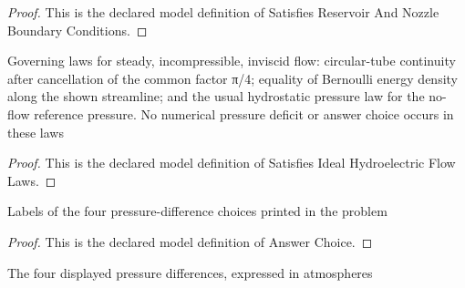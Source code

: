 \begin{proof}
  This is the declared model definition of Satisfies Reservoir And Nozzle Boundary Conditions.
\end{proof}
\begin{definition}
  \label{def:physics:phyx-mini-0725:phyxminiproblems-problemphyxmini0725-satisfiesidealhydroelectricflowlaws}
  Governing laws for steady, incompressible, inviscid flow: circular-tube continuity after cancellation of the common factor π/4; equality of Bernoulli energy density along the shown streamline; and the usual hydrostatic pressure law for the no-flow reference pressure. No numerical pressure deficit or answer choice occurs in these laws
\end{definition}
\begin{proof}
  This is the declared model definition of Satisfies Ideal Hydroelectric Flow Laws.
\end{proof}
\begin{definition}
  \label{def:physics:phyx-mini-0725:phyxminiproblems-problemphyxmini0725-answerchoice}
  Labels of the four pressure-difference choices printed in the problem
\end{definition}
\begin{proof}
  This is the declared model definition of Answer Choice.
\end{proof}
\begin{definition}
  \label{def:physics:phyx-mini-0725:phyxminiproblems-problemphyxmini0725-displayedpressuredifferenceinatmospheres}
  The four displayed pressure differences, expressed in atmospheres
\end{definition}
